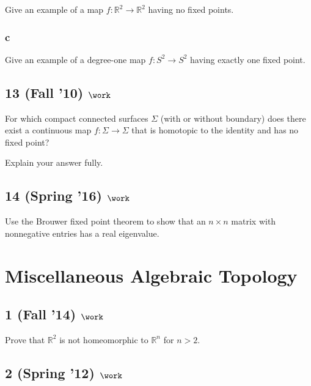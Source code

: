 Give an example of a map \(f : {\mathbb{R}}^2 \to {\mathbb{R}}^2\)
having no fixed points.

\hypertarget{c-9}{%
\subsubsection{c}\label{c-9}}

Give an example of a degree-one map \(f : S^2 \to S^2\) having exactly
one fixed point.

\hypertarget{fall-10-work-3}{%
\subsection{\texorpdfstring{13 (Fall '10)
\(\work\)}{13 (Fall '10) \textbackslash work}}\label{fall-10-work-3}}

For which compact connected surfaces \(\Sigma\) (with or without
boundary) does there exist a continuous map \(f : \Sigma \to \Sigma\)
that is homotopic to the identity and has no fixed point?

Explain your answer fully.

\hypertarget{spring-16-work-3}{%
\subsection{\texorpdfstring{14 (Spring '16)
\(\work\)}{14 (Spring '16) \textbackslash work}}\label{spring-16-work-3}}

Use the Brouwer fixed point theorem to show that an \(n \times n\)
matrix with nonnegative entries has a real eigenvalue.

\hypertarget{miscellaneous-algebraic-topology}{%
\section{Miscellaneous Algebraic
Topology}\label{miscellaneous-algebraic-topology}}

\hypertarget{fall-14-work-6}{%
\subsection{\texorpdfstring{1 (Fall '14)
\(\work\)}{1 (Fall '14) \textbackslash work}}\label{fall-14-work-6}}

Prove that \({\mathbb{R}}^2\) is not homeomorphic to \({\mathbb{R}}^n\)
for \(n > 2\).

\hypertarget{spring-12-work-3}{%
\subsection{\texorpdfstring{2 (Spring '12)
\(\work\)}{2 (Spring '12) \textbackslash work}}\label{spring-12-work-3}}

